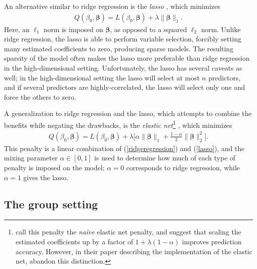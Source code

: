 \documentclass[11pt]{article}
\newcommand{\citeay}[1]{\citeauthor{#1} \citeyear{#1}}
\begin{document}
An alternative similar to ridge regression is the \textit{lasso} \cite{tibshirani1996regression}, which minimizes 
\begin{align}
    \label{lasso}
    Q(\beta_0, \bm{\beta}) = L(\beta_0, \bm{\beta}) + \lambda \| \bm{\beta} \|_1.
\end{align}
Here, an $\ell_1$ norm is imposed on $\bm{\beta}$, as opposed to a squared $\ell_2$ norm. Unlike ridge regression, the lasso is able to perform variable selection, forcibly setting many estimated coefficients to zero, producing sparse models. %
The resulting sparsity of the model often makes the lasso more preferable than ridge regression in the high-dimensional setting. Unfortunately, the lasso has several caveats as well; in the high-dimensional setting the lasso will select at most $n$ predictors, and if several predictors are highly-correlated, the lasso will select only one and force the others to zero. 

A generalization to ridge regression and the lasso, which attempts to combine the benefits while negating the drawbacks, is the \textit{elastic net}\footnote{\citeay{zou2005regularization} call this penalty the \textit{na\"{i}ve} elastic net penalty, and suggest that scaling the estimated coefficients up by a factor of $1 + \lambda(1 - \alpha)$ improves prediction accuracy. However, in their paper describing the implementation of the elastic net, \citeay{friedman2010regularization} abandon this distinction.} \cite{zou2005regularization}, which minimizes
\begin{align}
    \label{elasticnet}
    Q(\beta_0, \bm{\beta}) = L(\beta_0, \bm{\beta})
    + \lambda \Big[ \alpha \| \bm{\beta} \|_{1} + \frac{1 - \alpha}{2} \|\bm{\beta}\|_{2}^{2} \Big].
\end{align}
This penalty is a linear combination of (\ref{ridgeregression}) and (\ref{lasso}), and the mixing parameter $\alpha \in [0,1]$ is used to determine how much of each type of penalty is imposed on the model; $\alpha = 0$ corresponds to ridge regression, while $\alpha = 1$ gives the lasso. 

\subsection{The group setting}
\end{document}
